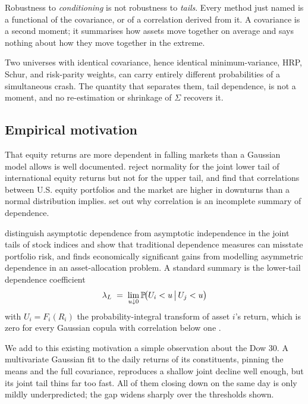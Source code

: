 Robustness to \emph{conditioning} is not robustness to \emph{tails}.
Every method
just named is a functional of the covariance, or of a correlation derived from it.
A covariance is a second moment; it summarises how assets move together on average
and says nothing about how they move together in the extreme.

Two universes with
identical covariance, hence identical minimum-variance, HRP, Schur, and
risk-parity weights, can carry entirely different probabilities of a simultaneous
crash.
The quantity that separates them, tail dependence, is not a moment, and no
re-estimation or shrinkage of $\Sigma$ recovers it.

\subsection{Empirical motivation}
\label{sec:tailmotiv}

That equity returns are more dependent in falling markets than a Gaussian model
allows is well documented.
\textcite{longinsolnik2001} reject normality for the
joint lower tail of international equity returns but not for the upper tail, and
\textcite{angchen2002} find that correlations between U.S. equity portfolios and
the market are higher in downturns than a normal distribution implies.
\textcite{embrechts2002} set out why correlation is an incomplete summary of
dependence.

\textcite{poon2004} distinguish asymptotic dependence from asymptotic
independence in the joint tails of stock indices and show that traditional
dependence measures can misstate portfolio risk, and \textcite{patton2004} finds
economically significant gains from modelling asymmetric dependence in an
asset-allocation problem.
A standard summary is the lower-tail dependence
coefficient
\begin{equation}
  \lambda_L \;=\; \lim_{u\downarrow 0}\mathbb{P}\!\big(U_i < u \,\big|\, U_j < u\big)
  \label{eq:lambdaL}
\end{equation}
with $U_i = F_i(R_i)$ the probability-integral transform of asset $i$'s return,
which is zero for every Gaussian copula with correlation below one
\parencite{sibuya1960}.

We add to this existing motivation a simple observation about the Dow 30. A
multivariate Gaussian fit to the daily returns of its constituents, pinning the
means and the full covariance, reproduces a shallow joint decline well enough, but
its joint tail thins far too fast. All of them closing down on the same day is only
mildly underpredicted; the gap widens sharply over the thresholds shown.

